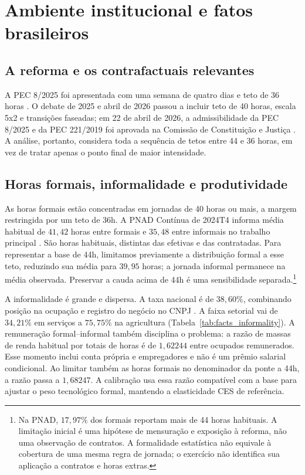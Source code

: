 \section{Ambiente institucional e fatos brasileiros}\label{sec:facts}

\subsection{A reforma e os contrafactuais relevantes}

A PEC 8/2025 foi apresentada com uma semana de quatro dias e teto de 36 horas \citep{CamaraPEC82025Protocol}. O debate de 2025 e abril de 2026 passou a incluir teto de 40 horas, escala 5x2 e transições faseadas; em 22 de abril de 2026, a admissibilidade da PEC 8/2025 e da PEC 221/2019 foi aprovada na Comissão de Constituição e Justiça \citep{CamaraFortyHours2025,CamaraFortyHoursBill2026,CamaraAdmissibility2026,CamaraSpecialCommission2026}. A análise, portanto, considera toda a sequência de tetos entre 44 e 36 horas, em vez de tratar apenas o ponto final de maior intensidade.

\subsection{Horas formais, informalidade e produtividade}

As horas formais estão concentradas em jornadas de 40 horas ou mais, a margem restringida por um teto de 36h. A PNAD Contínua de 2024T4 informa média habitual de $41{,}42$ horas entre formais e $35{,}48$ entre informais no trabalho principal \citep{PNAD2024T4Microdados}. São horas habituais, distintas das efetivas e das contratadas. Para representar a base de 44h, limitamos previamente a distribuição formal a esse teto, reduzindo sua média para $39{,}95$ horas; a jornada informal permanece na média observada. Preservar a cauda acima de 44h é uma sensibilidade separada.\footnote{Na PNAD, $17{,}97\%$ dos formais reportam mais de 44 horas habituais. A limitação inicial é uma hipótese de mensuração e exposição à reforma, não uma observação de contratos. A formalidade estatística não equivale à cobertura de uma mesma regra de jornada; o exercício não identifica sua aplicação a contratos e horas extras.}

A informalidade é grande e dispersa. A taxa nacional é de $38{,}60\%$, combinando posição na ocupação e registro do negócio no CNPJ \citep{PNADDicionario2022}. A faixa setorial vai de $34{,}21\%$ em serviços a $75{,}75\%$ na agricultura (Tabela~\ref{tab:facts_informality}). A remuneração formal--informal também disciplina o problema: a razão de massas de renda habitual por totais de horas é de $1{,}62244$ entre ocupados remunerados. Esse momento inclui conta própria e empregadores e não é um prêmio salarial condicional. Ao limitar também as horas formais no denominador da ponte a 44h, a razão passa a $1{,}68247$. A calibração usa essa razão compatível com a base para ajustar o peso tecnológico formal, mantendo a elasticidade CES de referência.

